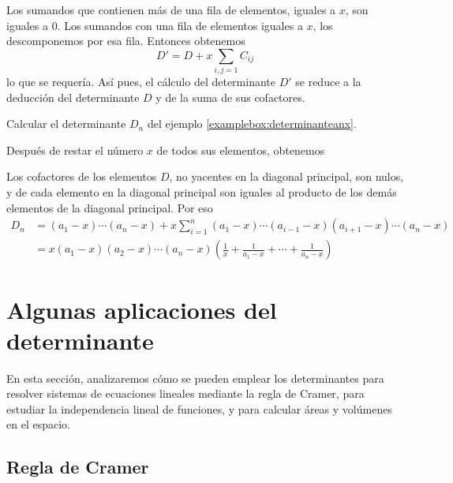 Los sumandos que contienen más de una fila de elementos, iguales a $x$, son iguales a $0$. Los sumandos con una fila de elementos iguales a $x$, los descomponemos por esa fila. Entonces obtenemos
$$D' = D + x\sum_{i, j=1} C_{ij}$$
lo que se requería. Así pues, el cálculo del determinante $D'$ se reduce a la deducción del determinante $D$ y de la suma de sus cofactores.

\newpage

\begin{examplebox}{}{}
    Calcular el determinante $D_n$ del ejemplo \ref{examplebox:determinanteanx}.

    \tcblower
    \solucion Después de restar el número $x$ de todos sus elementos, obtenemos
    \begin{matrizn}
    \end{matrizn}
    Los cofactores de los elementos $D$, no yacentes en la diagonal principal, son nulos, y de cada elemento en la diagonal principal son iguales al producto de los demás elementos de la diagonal principal. Por eso
    \begin{align*}
        D_n & = (a_1 - x) \cdots (a_n - x) + x\sum_{i=1}^n (a_1 - x) \cdots (a_{i-1} - x)(a_{i+1} - x) \cdots (a_n - x) \\
        & = x(a_1 - x)(a_2 - x) \cdots (a_n - x) \left( \frac{1}{x} + \frac{1}{a_1 - x} + \cdots + \frac{1}{a_n - x} \right)
    \end{align*}
\end{examplebox}

\section{Algunas aplicaciones del determinante}

En esta sección, analizaremos cómo se pueden emplear los determinantes para resolver sistemas de ecuaciones lineales mediante la regla de Cramer, para estudiar la independencia lineal de funciones, y para calcular áreas y volúmenes en el espacio.

\subsection*{Regla de Cramer}

